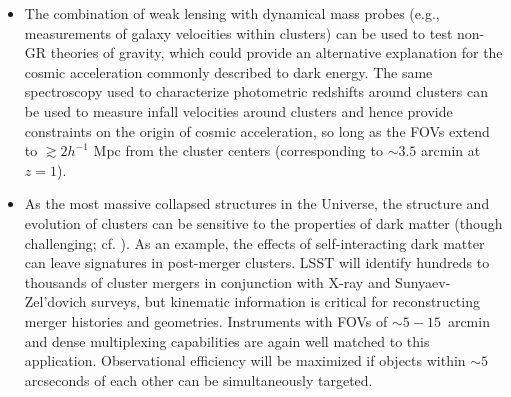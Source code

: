 \begin{itemize}
\item The combination of weak lensing with dynamical mass probes (e.g., measurements of galaxy velocities within clusters) can be used to test non-GR theories of gravity, which could provide an alternative explanation for the cosmic acceleration commonly described to dark energy. The same spectroscopy used to characterize photometric redshifts around clusters can be used to measure infall velocities around clusters and hence provide constraints on the origin of cosmic acceleration, so long as the FOVs extend to $\gtrsim 2h^{-1}$ Mpc from the cluster centers (corresponding to $\sim 3.5$ arcmin at $z=1$).

\item As the most massive collapsed structures in the Universe, the structure
and evolution of clusters can be sensitive to the properties of dark matter (though challenging; cf. 
\citet{Peter}). As an example, the
effects of self-interacting dark matter can leave signatures in post-merger clusters.  LSST will identify hundreds to thousands of cluster mergers in conjunction with X-ray and Sunyaev-Zel'dovich surveys, but kinematic
information is critical for reconstructing  merger histories and geometries.
Instruments with FOVs of $\sim 5-15$~arcmin and dense multiplexing capabilities are
again well matched to this application. Observational efficiency will be maximized if objects within $\sim5$arcseconds of each other can be simultaneously targeted. 
\end{itemize}

